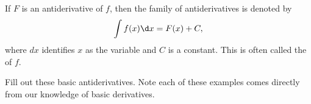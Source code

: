 \documentclass{ximera}
\begin{document}
\begin{definition}
If $F$ is an antiderivative of $f$, then the family of  antiderivatives is denoted by
\[
\int f(x) \d x = F(x)+C,
\]
where $dx$ identifies $x$ as the variable and $C$ is a constant.
This is often called the
 of $f$.
\end{definition}

Fill out these basic antiderivatives. Note each of these examples comes
directly from our knowledge of basic derivatives.

\end{document}
